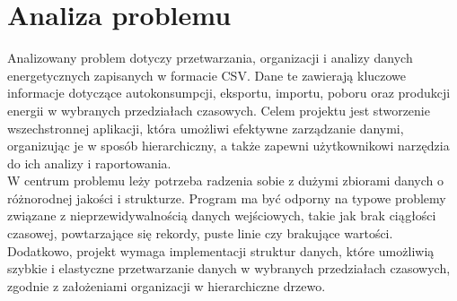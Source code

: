 \newpage
\section{Analiza problemu}		%
Analizowany problem dotyczy przetwarzania, organizacji i analizy danych energetycznych zapisanych w formacie CSV. Dane te zawierają kluczowe informacje dotyczące autokonsumpcji, eksportu, importu, poboru oraz produkcji energii w wybranych przedziałach czasowych. Celem projektu jest stworzenie wszechstronnej aplikacji, która umożliwi efektywne zarządzanie danymi, organizując je w sposób hierarchiczny, a także zapewni użytkownikowi narzędzia do ich analizy i raportowania.
\\
W centrum problemu leży potrzeba radzenia sobie z dużymi zbiorami danych o różnorodnej jakości i strukturze. Program ma być odporny na typowe problemy związane z nieprzewidywalnością danych wejściowych, takie jak brak ciągłości czasowej, powtarzające się rekordy, puste linie czy brakujące wartości. Dodatkowo, projekt wymaga implementacji struktur danych, które umożliwią szybkie i elastyczne przetwarzanie danych w wybranych przedziałach czasowych, zgodnie z założeniami organizacji w hierarchiczne drzewo.

